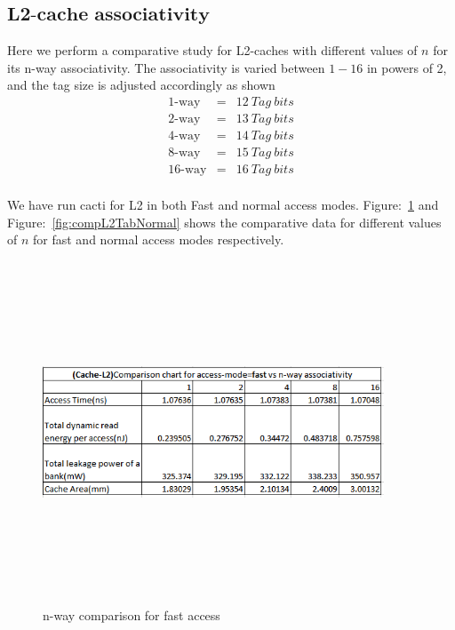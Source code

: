 \documentclass{tufte-handout}
\begin{document}
	\subsection{$\textbf{L2-cache associativity}$}
	Here we perform a comparative study for L2-caches with different values of $n$ for its n-way associativity. The associativity is varied between $1-16$ in powers of 2, and the tag size is adjusted accordingly as shown
	\begin{eqnarray*}
		\mbox{1-way} &=& 12\ Tag\ bits \\
		\mbox{2-way} &=& 13\ Tag\ bits \\
		\mbox{4-way} &=& 14\ Tag\ bits \\
		\mbox{8-way} &=& 15\ Tag\ bits \\
		\mbox{16-way} &=& 16\ Tag\ bits \\
	\end{eqnarray*}

	We have run cacti for L2 in both Fast and normal access modes. Figure:~\ref{fig:compL2TabFast} and Figure:~\ref{fig:compL2TabNormal} shows the comparative data for different values of $n$ for fast and normal access modes respectively.
		\begin{figure}[h!]
		\label{fig:compL2TabFast}
		\centering
		\includegraphics[width = 4in, height = 4in]{compL2TabFast}
		\caption{n-way comparison for fast access }
		\end{figure}
\end{document}
